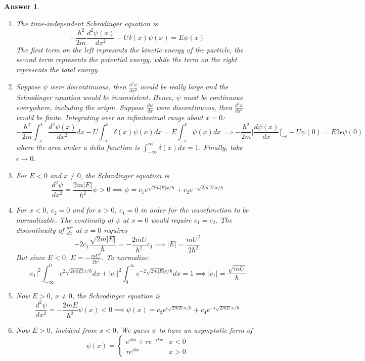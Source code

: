\documentclass[a4paper]{article}
\newtheorem{ans}{Answer}[subsection]
\theoremstyle{new}
\begin{document}
\begin{ans}\leavevmode
\begin{enumerate}[label=(\roman*)]
\item The time-independent Schrodinger equation is
$$-\frac{\hbar^2}{2m}\frac{d^2\psi(x)}{dx^2}-U\delta(x)\psi(x)=E\psi(x)$$
The first term on the left represents the kinetic energy of the particle, the second term represents the potential energy, while the term on the right represents the total energy.
\item Suppose $\psi$ were discontinuous, then $\frac{d^2\psi}{dx^2}$ would be really large and the Schrodinger equation would be inconsistent. Hence, $\psi$ must be continuous everywhere, including the origin. Suppose $\frac{d\psi}{dx}$ were discontinuous, then $\frac{d^2\psi}{dx^2}$ would be finite. Integrating over an infinitesimal range about $x=0$:
$$-\frac{\hbar^2}{2m}\int_{-\epsilon}^\epsilon\frac{d^2\psi(x)}{dx^2}dx-U\int_{-\epsilon}^\epsilon\delta(x)\psi(x)dx=E\int_{-\epsilon}^\epsilon\psi(x)dx\implies-\frac{\hbar^2}{2m}\bigg[\frac{d\psi(x)}{dx}\bigg]_{-\epsilon}^\epsilon-U\psi(0)=E2\epsilon\psi(0)$$
where the area under a delta function is $\int_{-\infty}^\infty\delta(x)dx=1$. Finally, take $\epsilon\rightarrow 0$.
\item For $E<0$ and $x\neq 0$, the Schrodinger equation is
$$\frac{d^2\psi}{dx^2}=\frac{2m|E|}{\hbar^2}\psi>0\implies\psi=c_1e^{\sqrt{2m|E|}x/\hbar}+c_2e^{-\sqrt{2m|E|}x/\hbar}$$
\item For $x<0$, $c_2=0$ and for $x>0$, $c_1=0$ in order for the wavefunction to be normalizable. The continuity of $\psi$ at $x=0$ would require $c_1=c_2$. The discontinuity of $\frac{d\psi}{dx}$ at $x=0$ requires
$$-2c_1\frac{\sqrt{2m|E|}}{\hbar}=-\frac{2mU}{\hbar^2}c_1\implies |E|=\frac{mU^2}{2\hbar^2}$$
But since $E<0$, $E=-\frac{mU^2}{2\hbar^2}$. To normalize:
$$|c_1|^2\int_{-\infty}^0e^{2\sqrt{2m|E|}x/\hbar}dx+|c_1|^2\int_0^\infty e^{-2\sqrt{2m|E|}x/\hbar}dx=1\implies |c_1|=\frac{\sqrt{mU}}{\hbar}$$
\item Now $E>0$, $x\neq 0$, the Schrodinger equation is
$$\frac{d^2\psi}{dx^2}=-\frac{2mE}{\hbar^2}\psi(x)<0\implies\psi(x)=c_3e^{i\sqrt{2mE}x/\hbar}+c_4e^{-i\sqrt{2mE}x/\hbar}$$
\item Now $E>0$, incident from $x<0$. We guess $\psi$ to have an asymptotic form of
$$\psi(x)=
\left\{
        \begin{array}{ll}
      e^{ikx}+re^{-ikx} & x<0\\
      \tau e^{ikx} & x>0
        \end{array}
$$
\end{enumerate}
\end{ans}
\end{document}
